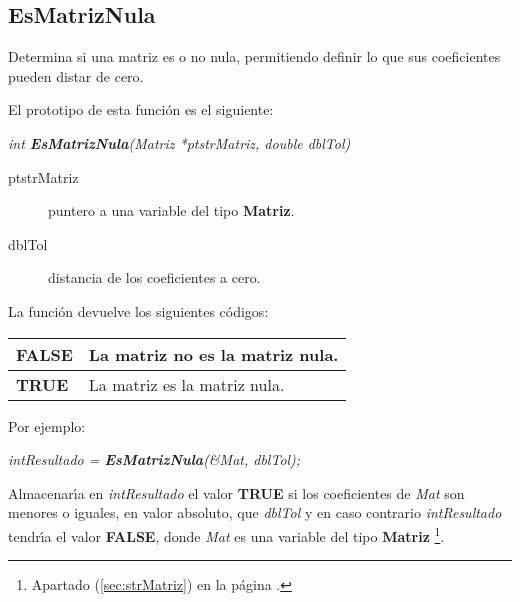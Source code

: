 \subsection{EsMatrizNula}
Determina si una matriz es o no nula, permitiendo definir lo que sus 
coeficientes pueden distar de cero.\newline

El prototipo de esta funci\'on es el siguiente:

\begin{center}
\emph{int \textbf{EsMatrizNula}(Matriz *ptstrMatriz, double dblTol)}
\end{center}

\begin{description}
\item[ptstrMatriz] puntero a una variable del tipo \textbf{Matriz}.
\item[dblTol] distancia de los coeficientes a cero.
\end{description}

La funci\'on devuelve los siguientes c\'odigos:

\begin{center}
\begin{tabular}{|l|l|}
\hline
\textbf{FALSE} & La matriz no es la matriz nula. \\
\hline
\textbf{TRUE} & La matriz es la matriz nula. \\
\hline
\end{tabular}
\end{center}

Por ejemplo:

\begin{center}
\emph{intResultado = \textbf{EsMatrizNula}(\&Mat, dblTol);}
\end{center}

Almacenar\'{\i}a en \emph{intResultado} el valor \textbf{TRUE} si los
coeficientes de \emph{Mat} son menores o iguales, en valor absoluto, que 
\emph{dblTol} y en caso contrario \emph{intResultado} tendr\'{\i}a el valor
\textbf{FALSE}, donde \emph{Mat} es una variable del tipo \textbf{Matriz}%
\footnote{Apartado (\ref{sec:strMatriz}) en la p\'agina 
\pageref{sec:strMatriz}.}.
